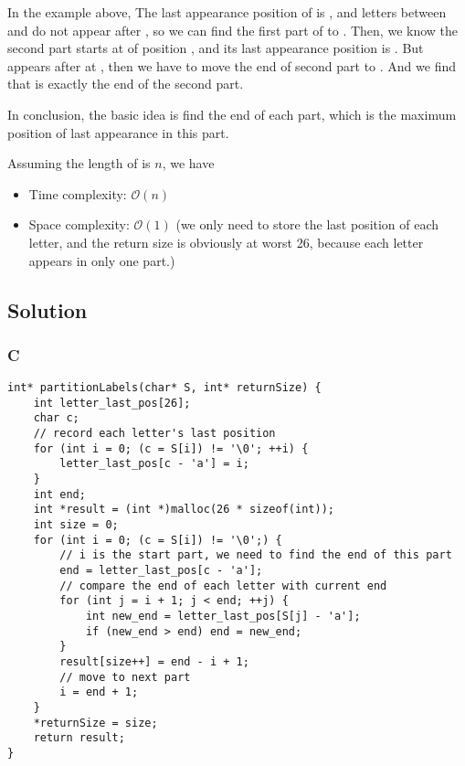 In the example above, The last appearance position of  is , and letters between  and  do not appear after , so we can find the first part of  to . Then, we know the second part starts at  of position , and its last appearance position is . But  appears after  at , then we have to move the end of second part to . And we find that  is exactly the end of the second part.

In conclusion, the basic idea is find the end of each part, which is the maximum position of last appearance in this part.

Assuming the length of  is $n$, we have
\begin{itemize}
    \item Time complexity: $\mathcal{O}(n)$
    \item Space complexity: $\mathcal{O}(1)$ (we only need to store the last position of each letter, and the return size is obviously at worst 26, because each letter appears in only one part.)
\end{itemize}

\subsection*{Solution}
\subsubsection{C}
\begin{verbatim}
int* partitionLabels(char* S, int* returnSize) {
    int letter_last_pos[26];
    char c;
    // record each letter's last position
    for (int i = 0; (c = S[i]) != '\0'; ++i) {
        letter_last_pos[c - 'a'] = i;
    }
    int end;
    int *result = (int *)malloc(26 * sizeof(int));
    int size = 0;
    for (int i = 0; (c = S[i]) != '\0';) {
        // i is the start part, we need to find the end of this part
        end = letter_last_pos[c - 'a'];
        // compare the end of each letter with current end
        for (int j = i + 1; j < end; ++j) {
            int new_end = letter_last_pos[S[j] - 'a'];
            if (new_end > end) end = new_end;
        }
        result[size++] = end - i + 1;
        // move to next part
        i = end + 1;
    }
    *returnSize = size;
    return result;
}
\end{verbatim}

\newpage


